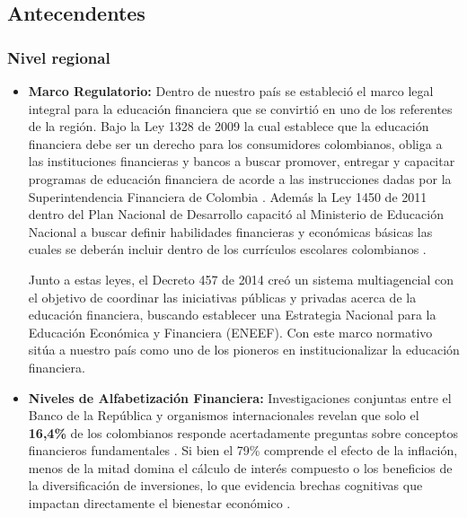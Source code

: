 \subsection*{Antecendentes}

\subsubsection*{Nivel regional}
\begin{itemize}
	\item \textbf{Marco Regulatorio:} Dentro de nuestro país se estableció el marco legal integral para la educación financiera que se convirtió en uno de los referentes de la región. Bajo la Ley 1328 de 2009 la cual establece que la educación financiera debe ser un derecho para los consumidores colombianos, obliga a las instituciones financieras y bancos a buscar promover, entregar y capacitar programas de educación financiera de acorde a las instrucciones dadas por la Superintendencia Financiera de Colombia \parencite[p. 10]{Superintendencia01}. Además la Ley 1450 de 2011 dentro del Plan Nacional de Desarrollo capacitó al Ministerio de Educación Nacional a buscar definir habilidades financieras y económicas básicas las cuales se deberán incluir dentro de los currículos escolares colombianos \parencite[p. 15]{Superintendencia01}.
	
	Junto a estas leyes, el Decreto 457 de 2014 creó un sistema multiagencial con el objetivo de coordinar las iniciativas públicas y privadas acerca de la educación financiera, buscando establecer una Estrategia Nacional para la Educación Económica y Financiera (ENEEF). Con este marco normativo sitúa a nuestro país como uno de los pioneros en institucionalizar la educación financiera.
	
	\item \textbf{Niveles de Alfabetización Financiera:} Investigaciones conjuntas entre el Banco de la República y organismos internacionales revelan que solo el \textbf{16,4\%} de los colombianos responde acertadamente preguntas sobre conceptos financieros fundamentales \parencite[p. 22]{BancoMundial01}. Si bien el 79\% comprende el efecto de la inflación, menos de la mitad domina el cálculo de interés compuesto o los beneficios de la diversificación de inversiones, lo que evidencia brechas cognitivas que impactan directamente el bienestar económico \parencite[p. 25]{ComisionIntersectorial01}.
	

\end{itemize}
